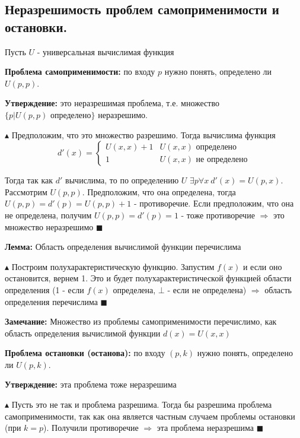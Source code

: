 \subsection{Неразрешимость проблем самоприменимости и остановки.}
\par Пусть $U$ - универсальная вычислимая функция
\par \textbf{Проблема самоприменимости:} по входу $p$ нужно понять, определено ли $U(p,p)$.
\par \textbf{Утверждение:} это неразрешимая проблема, т.е. множество $\{p|U(p,p) \text{ определено}\}$ неразрешимо.
\par $\blacktriangle$ Предположим, что это множество разрешимо. Тогда вычислима функция $$d'(x)=\begin{cases}
   U(x,x)+1 &\text{$U(x,x)$ определено}\\
   1 &\text{$U(x,x)$ не определено}
 \end{cases}$$
 \par Тогда так как $d'$ вычислима, то по определению $U$ $\exists p \forall x \: d'(x)=U(p, x)$. Рассмотрим $U(p,p)$. Предположим, что она определена, тогда $U(p,p)=d'(p)=U(p,p)+1$ - противоречие. Если предположим, что она не определена, получим $U(p,p)=d'(p)=1$ - тоже противоречие $\Rightarrow$ это множество неразрешимо $\blacksquare$
\par \textbf{Лемма:} Область определения вычислимой функции перечислима
\par $\blacktriangle$ Построим полухарактеристическую функцию. Запустим $f(x)$ и если оно остановится, вернем 1. Это и будет полухарактеристической функцией области определения (1 - если $f(x)$ определена, $\bot$ - если не определена) $\Rightarrow$ область определения перечислима $\blacksquare$
\par \textbf{Замечание:} Множество из проблемы самоприменимости перечислимо, как область определения вычислимой функции $d(x)=U(x,x)$
\par \textbf{Проблема остановки (останова):} по входу $(p,k)$ нужно понять, определено ли $U(p,k)$.
\par \textbf{Утверждение:} эта проблема тоже неразрешима
\par $\blacktriangle$ Пусть это не так и проблема разрешима. Тогда бы разрешима проблема самоприменимости, так как она является частным случаем проблемы остановки (при $k=p$). Получили противоречие $\Rightarrow$ эта проблема неразрешима $\blacksquare$